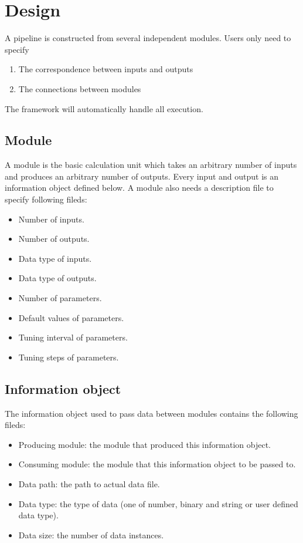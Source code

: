 \documentclass{article}
\begin{document}
\section{Design}
    A pipeline is constructed from several independent modules.
    Users only need to specify
    \begin{enumerate}
        \item The correspondence between inputs and outputs
        \item The connections between modules
    \end{enumerate}
    The framework will automatically handle all execution.

    \subsection{Module}
    A module is the basic calculation unit which takes an arbitrary number of inputs and produces an arbitrary number of outputs.
    Every input and output is an information object defined below.
    A module also needs a description file to specify following fileds:
    \begin{itemize}
        \item Number of inputs.
        \item Number of outputs.
        \item Data type of inputs.
        \item Data type of outputs.
        \item Number of parameters.
        \item Default values of parameters.
        \item Tuning interval of parameters.
        \item Tuning steps of parameters.
    \end{itemize}

    \subsection{Information object}
    The information object used to pass data between modules contains the following fileds:

    \begin{itemize}
        \item Producing module: the module that produced this information object.
        \item Consuming module: the module that this information object to be passed to.
        \item Data path: the path to actual data file.
        \item Data type: the type of data (one of number, binary and string or user defined data type).
        \item Data size: the number of data instances.
    \end{itemize}
\end{document}
